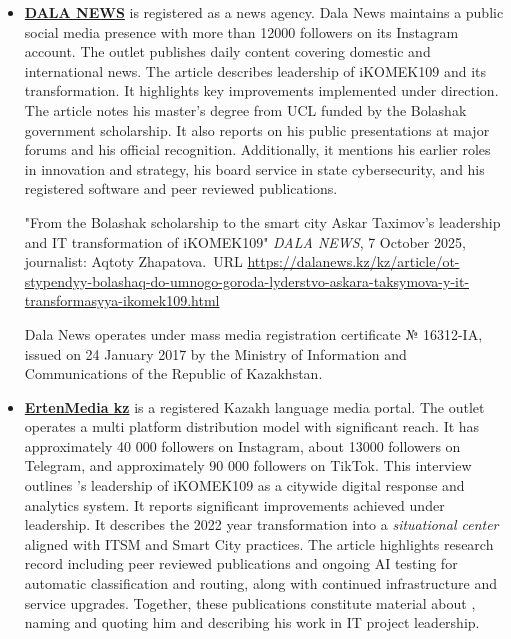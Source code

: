 \begin{itemize}
Elorda.info is registered as a network edition under certificate № N16386-SI, issued on 10 March 2017 by the Committee of State Control in the field of communications, informatization, and mass media under the Ministry of Information and Communications of the Republic of Kazakhstan.


\item \textbf{\underline{DALA NEWS}} is registered as a news agency. Dala News maintains a public social media presence with more than 12000 followers on its Instagram account. The outlet publishes daily content covering domestic and international news.
The article describes \mrls leadership of iKOMEK109 and its transformation. It highlights key improvements implemented under \mrls direction. The article notes his master's degree from UCL funded by the Bolashak government scholarship. It also reports on his public presentations at major forums and his official recognition. Additionally, it mentions his earlier roles in innovation and strategy, his board service in state cybersecurity, and his registered software and peer reviewed publications.


"From the Bolashak scholarship to the smart city Askar Taximov's leadership and IT transformation of iKOMEK109" \emph{DALA NEWS}, 7 October 2025, journalist: Aqtoty Zhapatova.\
URL \url{https://dalanews.kz/kz/article/ot-stypendyy-bolashaq-do-umnogo-goroda-lyderstvo-askara-taksymova-y-it-transformasyya-ikomek109.html}





Dala News operates under mass media registration certificate № 16312-IA, issued on 24 January 2017 by the Ministry of Information and Communications of the Republic of Kazakhstan.
\ExhibitList{DalaNewsArticle, DalaNewsSite, DalaNewsInst}


\item \textbf{\underline{ErtenMedia kz}} is a registered Kazakh language media portal. The outlet operates a multi platform distribution model with significant reach. It has approximately 40 000 followers on Instagram, about 13000 followers on Telegram, and approximately 90 000 followers on TikTok.
This interview outlines \mrl's leadership of iKOMEK109 as a citywide digital response and analytics system. It reports significant improvements achieved under \mrls leadership. It describes the 2022 year transformation into a \emph{situational center} aligned with ITSM and Smart City practices. The article highlights \mrls research record including peer reviewed publications and ongoing AI testing for automatic classification and routing, along with continued infrastructure and service upgrades.
Together, these publications constitute material about \mrl, naming and quoting him and describing his work in IT project leadership.



\end{itemize}
